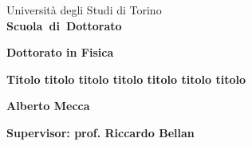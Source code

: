 \begin{titlepage}






{}
\begin{center}
\begin{large}
Universit\`a degli Studi di Torino \\
{\bf Scuola~di~Dottorato}
\end{large}
\end{center}
\hrulefill
\begin{center}
\begin{large}
{\bf Dottorato in Fisica}
\end{large}
\end{center}

\vspace{2cm}
\Large{\bf Titolo titolo titolo titolo titolo titolo titolo}

\vspace{8cm}
\large{\bf Alberto Mecca}

\vspace{1cm}
\large{\bf Supervisor: prof. Riccardo Bellan}

\end{titlepage}
